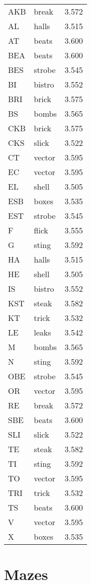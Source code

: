 \documentclass[11pt]{amsart}
\begin{document}
\begin{tabular}{|l|l|l|}
\hline
AKB & break & 3.572 \\
AL & halls & 3.515 \\
AT & beats & 3.600 \\
BEA & beats & 3.600 \\
BES & strobe & 3.545 \\
BI & bistro & 3.552 \\
BRI & brick & 3.575 \\
BS & bombs & 3.565 \\
CKB & brick & 3.575 \\
CKS & slick & 3.522 \\
CT & vector & 3.595 \\
EC & vector & 3.595 \\
EL & shell & 3.505 \\
ESB & boxes & 3.535 \\
EST & strobe & 3.545 \\
F & flick & 3.555 \\
G & sting & 3.592 \\
HA & halls & 3.515 \\
HE & shell & 3.505 \\
IS & bistro & 3.552 \\
KST & steak & 3.582 \\
KT & trick & 3.532 \\
LE & leaks & 3.542 \\
M & bombs & 3.565 \\
N & sting & 3.592 \\
OBE & strobe & 3.545 \\
OR & vector & 3.595 \\
RE & break & 3.572 \\
SBE & beats & 3.600 \\
SLI & slick & 3.522 \\
TE & steak & 3.582 \\
TI & sting & 3.592 \\
TO & vector & 3.595 \\
TRI & trick & 3.532 \\
TS & beats & 3.600 \\
V & vector & 3.595 \\
X & boxes & 3.535 \\
\hline
\end{tabular}


\section{Mazes}
\end{document}
